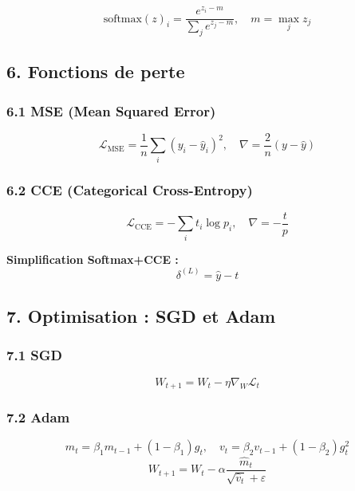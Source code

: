 \documentclass[
  letterpaper,
  DIV=11,
  numbers=noendperiod]{scrartcl}
\begin{document}
\[\text{softmax}(z)_i = \frac{e^{z_i - m}}{\sum_j e^{z_j - m}}, \quad m = \max_j z_j\]

\subsection{6. Fonctions de perte}\label{fonctions-de-perte}

\subsubsection{6.1 MSE (Mean Squared Error)}\label{mse}

\[\mathcal{L}_{\text{MSE}} = \frac{1}{n} \sum_i (y_i - \hat{y}_i)^2, \quad \nabla = \frac{2}{n}(y - \hat{y})\]

\subsubsection{6.2 CCE (Categorical Cross-Entropy)}\label{cce}

\[\mathcal{L}_{\text{CCE}} = -\sum_i t_i \log p_i, \quad \nabla = -\frac{t}{p}\]

\textbf{Simplification Softmax+CCE :} \[\delta^{(L)} = \hat{y} - t\]

\subsection{7. Optimisation : SGD et Adam}\label{optimisation-sgd-adam}

\subsubsection{7.1 SGD}\label{sgd}

\[W_{t+1} = W_t - \eta \nabla_W \mathcal{L}_t\]

\subsubsection{7.2 Adam}\label{adam}

\[m_t = \beta_1 m_{t-1} + (1-\beta_1) g_t, \quad v_t = \beta_2 v_{t-1} + (1-\beta_2) g_t^2\]
\[W_{t+1} = W_t - \alpha \frac{\hat{m}_t}{\sqrt{\hat{v}_t} + \varepsilon}\]
\end{document}
